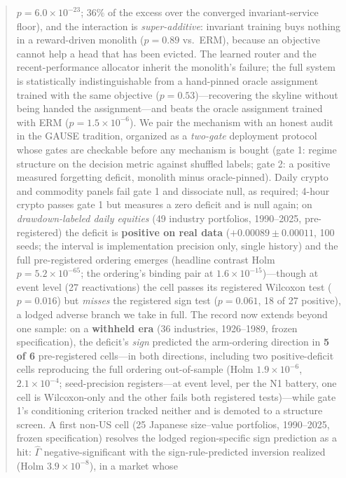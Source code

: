 \documentclass{article}
\begin{document}
\begin{abstract}
$p{=}6.0{\times}10^{-23}$; $36\%$ of the excess over the converged
invariant-service floor), and the interaction is \emph{super-additive}: invariant training buys
nothing in a reward-driven monolith ($p{=}0.89$ vs.\ ERM), because an objective
cannot help a head that has been evicted. The learned router and the
recent-performance allocator inherit the monolith's failure; the full system
is statistically indistinguishable from a hand-pinned oracle assignment
trained with the same objective ($p{=}0.53$)---recovering the skyline without
being handed the assignment---and beats the oracle assignment
trained with ERM ($p{=}1.5{\times}10^{-6}$). We pair the
mechanism with an honest audit in the GAUSE tradition, organized as a
\emph{two-gate} deployment protocol whose gates are checkable before
any mechanism is bought (gate 1: regime structure on the decision
metric against shuffled labels; gate 2: a positive measured forgetting
deficit, monolith minus oracle-pinned). Daily crypto and commodity
panels fail gate 1 and dissociate null, as required; 4-hour crypto
passes gate 1 but measures a zero deficit and is null again; on
\emph{drawdown-labeled daily equities} (49 industry portfolios,
1990--2025, pre-registered) the deficit is \textbf{positive on real
data} ($+0.00089 \pm 0.00011$, 100 seeds; the interval is
implementation precision only, single history) and the full
pre-registered ordering emerges (headline
contrast Holm $p{=}5.2{\times}10^{-65}$; the ordering's binding pair
at $1.6{\times}10^{-15}$)---though at event level (27 reactivations)
the cell passes its registered Wilcoxon test ($p{=}0.016$) but
\emph{misses} the registered sign test ($p{=}0.061$, 18 of 27
positive), a lodged adverse branch we take in full. The record now
extends beyond one sample:
on a \textbf{withheld era} (36 industries, 1926--1989, frozen
specification), the deficit's \emph{sign} predicted the arm-ordering
direction in \textbf{5 of 6} pre-registered cells---in both
directions, including two positive-deficit cells reproducing the full
ordering out-of-sample (Holm $1.9{\times}10^{-6}$,
$2.1{\times}10^{-4}$; seed-precision registers---at event level, per
the N1 battery, one cell is Wilcoxon-only and the other fails both
registered tests)---while gate 1's conditioning criterion tracked
neither and is demoted to a structure screen. A first non-US cell
(25 Japanese size--value portfolios, 1990--2025, frozen
specification) resolves the lodged region-specific sign prediction
as a hit: $\hat\Gamma$ negative-significant with the
sign-rule-predicted
inversion realized (Holm $3.9{\times}10^{-8}$), in a market whose

\end{abstract}
\end{document}
